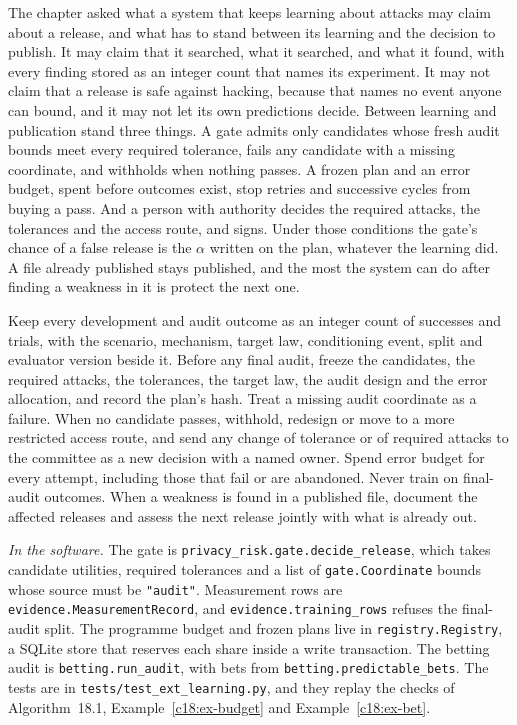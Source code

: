 The chapter asked what a system that keeps learning about attacks may claim about a
release, and what has to stand between its learning and the decision to publish. It may claim
that it searched, what it searched, and what it found, with every finding stored as an integer
count that names its experiment. It may not claim that a release is safe against hacking, because that names no event anyone can bound, and it may not let its own predictions decide.
Between learning and publication stand three things. A gate admits only candidates whose
fresh audit bounds meet every required tolerance, fails any candidate with a missing coordinate, and withholds when nothing passes. A frozen plan and an error budget, spent before
outcomes exist, stop retries and successive cycles from buying a pass. And a person with
authority decides the required attacks, the tolerances and the access route, and signs. Under
those conditions the gate's chance of a false release is the $\alpha$ written on the plan, whatever
the learning did. A file already published stays published, and the most the system can do
after finding a weakness in it is protect the next one.

\begin{inpractice}
Keep every development and audit outcome as an integer count of successes and trials, with
the scenario, mechanism, target law, conditioning event, split and evaluator version beside it.
Before any final audit, freeze the candidates, the required attacks, the tolerances, the target law,
the audit design and the error allocation, and record the plan's hash. Treat a missing audit coordinate as a failure. When no candidate passes, withhold, redesign or move to a more restricted
access route, and send any change of tolerance or of required attacks to the committee as a new
decision with a named owner. Spend error budget for every attempt, including those that fail or
are abandoned. Never train on final-audit outcomes. When a weakness is found in a published
file, document the affected releases and assess the next release jointly with what is already out.

\medskip\noindent\textit{In the software.} The gate is \texttt{privacy\_risk.gate.decide\_release}, which takes candidate utilities, required
tolerances and a list of \texttt{gate.Coordinate} bounds whose source must be \texttt{"audit"}. Measurement rows are \texttt{evidence.MeasurementRecord}, and
\texttt{evidence.training\_rows} refuses the final-audit split. The programme budget and frozen plans
live in \texttt{registry.Registry}, a SQLite store that reserves each share inside a write transaction. The betting audit is \texttt{betting.run\_audit}, with
bets from \texttt{betting.predictable\_bets}. The tests are in \texttt{tests/test\_ext\_learning.py}, and they replay the checks of Algorithm~18.1, Example~\ref{c18:ex-budget} and Example~\ref{c18:ex-bet}.
\end{inpractice}

